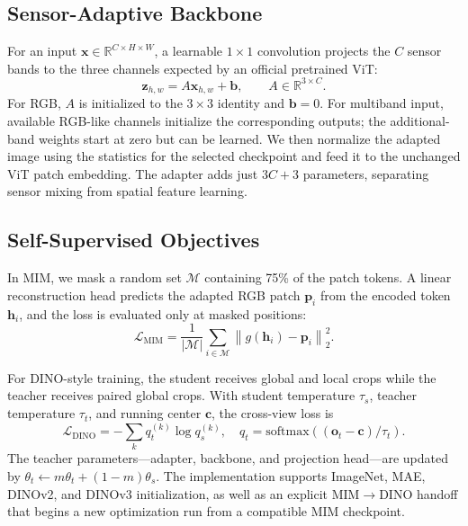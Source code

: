 \documentclass[10pt,twocolumn,letterpaper]{article}
\begin{document}
\subsection{Sensor-Adaptive Backbone}
For an input $\mathbf{x}\in\mathbb{R}^{C\times H\times W}$, a learnable
$1\!\times\!1$ convolution projects the $C$ sensor bands to the three channels
expected by an official pretrained ViT:
\begin{equation}
 \mathbf{z}_{h,w}=A\mathbf{x}_{h,w}+\mathbf{b},\qquad
 A\in\mathbb{R}^{3\times C}.
 \label{eq:adapter}
\end{equation}
For RGB, $A$ is initialized to the $3\times3$ identity and $\mathbf{b}=0$.
For multiband input, available RGB-like channels initialize the corresponding
outputs; the additional-band weights start at zero but can be learned. We then
normalize the adapted image using the statistics for the selected checkpoint and
feed it to the unchanged ViT patch embedding. The adapter adds just $3C+3$
parameters, separating sensor mixing from spatial feature learning.

\subsection{Self-Supervised Objectives}
In MIM, we mask a random set $\mathcal{M}$ containing 75\% of the patch tokens.
A linear reconstruction head predicts the adapted RGB patch $\mathbf{p}_i$ from
the encoded token $\mathbf{h}_i$, and the loss is evaluated only at masked
positions:
\begin{equation}
 \mathcal{L}_{\mathrm{MIM}}=
 \frac{1}{|\mathcal{M}|}\sum_{i\in\mathcal{M}}
 \left\|g(\mathbf{h}_i)-\mathbf{p}_i\right\|_2^2.
 \label{eq:mim}
\end{equation}

For DINO-style training, the student receives global and local crops while the
teacher receives paired global crops. With student temperature $\tau_s$, teacher
temperature $\tau_t$, and running center $\mathbf{c}$, the cross-view loss is
\begin{equation}
 \mathcal{L}_{\mathrm{DINO}}=-\sum_k
 q_t^{(k)}\log q_s^{(k)},\quad
 q_t=\mathrm{softmax}((\mathbf{o}_t-\mathbf{c})/\tau_t).
 \label{eq:dino}
\end{equation}
The teacher parameters---adapter, backbone, and projection head---are updated by
$\theta_t\leftarrow m\theta_t+(1-m)\theta_s$. The implementation supports
ImageNet, MAE, DINOv2, and DINOv3 initialization, as well as an explicit
MIM$\rightarrow$DINO handoff that begins a new optimization run from a compatible
MIM checkpoint.
\end{document}
